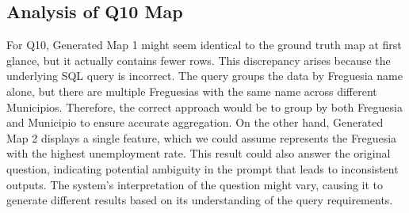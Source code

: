 

\subsection{Analysis of Q10 Map}

For Q10, Generated Map 1 might seem identical to the ground truth map at first glance, but it actually contains fewer rows. This discrepancy arises because the underlying SQL query is incorrect. The query groups the data by Freguesia name alone, but there are multiple Freguesias with the same name across different Municipios. Therefore, the correct approach would be to group by both Freguesia and Municipio to ensure accurate aggregation. On the other hand, Generated Map 2 displays a single feature, which we could assume represents the Freguesia with the highest unemployment rate. This result could also answer the original question, indicating potential ambiguity in the prompt that leads to inconsistent outputs. The system's interpretation of the question might vary, causing it to generate different results based on its understanding of the query requirements.


